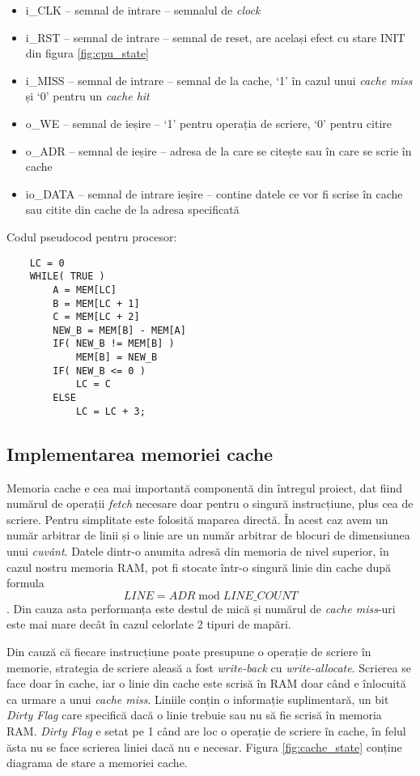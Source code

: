 \documentclass[../main.tex]{subfiles}
\begin{document}
\begin{itemize}
    \item i\_CLK -- semnal de intrare -- semnalul de \emph{clock}
    \item i\_RST -- semnal de intrare -- semnal de reset, are același efect cu stare INIT din figura \ref{fig:cpu_state}
    \item i\_MISS -- semnal de intrare -- semnal de la cache, `1' în cazul unui \emph{cache miss} și `0' pentru un \emph{cache hit}
    \item o\_WE -- semnal de ieșire -- `1' pentru operația de scriere, `0' pentru citire
    \item o\_ADR -- semnal de ieșire -- adresa de la care se citește sau în care se scrie în cache
    \item io\_DATA -- semnal de intrare ieșire -- contine datele ce vor fi scrise în cache sau citite din cache de la 
    adresa specificată
\end{itemize}

\noindent\begin{minipage}{\linewidth}
Codul pseudocod pentru procesor:
\begin{lstlisting}
    LC = 0
    WHILE( TRUE )
        A = MEM[LC]
        B = MEM[LC + 1]
        C = MEM[LC + 2]
        NEW_B = MEM[B] - MEM[A]
        IF( NEW_B != MEM[B] )
            MEM[B] = NEW_B
        IF( NEW_B <= 0 )
            LC = C
        ELSE
            LC = LC + 3;
\end{lstlisting}
\end{minipage}

\subsection{Implementarea memoriei cache}
Memoria cache e cea mai importantă componentă din întregul proiect, dat fiind numărul de operații \emph{fetch} necesare
doar pentru o singură instrucțiune, plus cea de scriere. Pentru simplitate este folosită maparea directă. În acest caz
avem un număr arbitrar de linii și o linie are un număr arbitrar de blocuri de dimensiunea unui \emph{cuvânt}.
Datele dintr-o anumita adresă din memoria de nivel superior, în cazul nostru memoria RAM, pot fi stocate într-o singură
linie din cache după formula $$LINE = ADR \;\mathrm{mod}\; LINE\_COUNT$$. Din cauza asta performanța este destul de mică și numărul
de \emph{cache miss}-uri este mai mare decât în cazul celorlate 2 tipuri de mapări.

Din cauză că fiecare instrucțiune poate presupune o operație de scriere în memorie, strategia de scriere aleasă a fost
\emph{write-back} cu \emph{write-allocate}. Scrierea se face doar în cache, iar o linie din cache este scrisă în RAM
doar când e înlocuită ca urmare a unui \emph{cache miss}. Liniile conțin o informație suplimentară, un bit \emph{Dirty Flag}
care specifică dacă o linie trebuie sau nu să fie scrisă în memoria RAM. \emph{Dirty Flag} e setat pe 1 când are loc o
operație de scriere în cache, în felul ăsta nu se face scrierea liniei dacă nu e necesar. Figura \ref{fig:cache_state}
conține diagrama de stare a memoriei cache.
\end{document}
